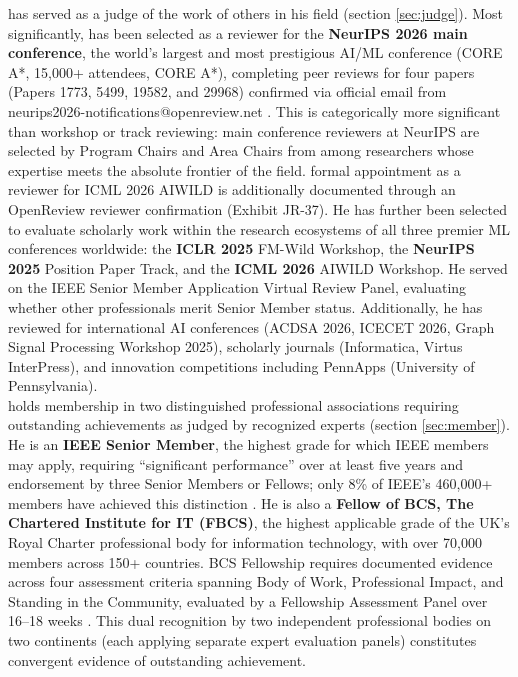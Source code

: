 \dr has served as a judge of the work of others in his field (section \ref{sec:judge}). Most significantly, \dr has been selected as a reviewer for the \textbf{NeurIPS 2026 main conference}, the world's largest and most prestigious AI/ML conference (CORE A*, 15,000+ attendees, CORE A*), completing peer reviews for four papers (Papers 1773, 5499, 19582, and 29968) confirmed via official email from neurips2026-notifications@openreview.net \cite{JR39,JR41,JR43,JR45}. This is categorically more significant than workshop or track reviewing: main conference reviewers at NeurIPS are selected by Program Chairs and Area Chairs from among researchers whose expertise meets the absolute frontier of the field. \drs formal appointment as a reviewer for ICML 2026 AIWILD is additionally documented through an OpenReview reviewer confirmation \cite{JR37} (Exhibit JR-37). He has further been selected to evaluate scholarly work within the research ecosystems of all three premier ML conferences worldwide: the \textbf{ICLR 2025} FM-Wild Workshop, the \textbf{NeurIPS 2025} Position Paper Track, and the \textbf{ICML 2026} AIWILD Workshop. He served on the IEEE Senior Member Application Virtual Review Panel, evaluating whether other professionals merit Senior Member status. Additionally, he has reviewed for international AI conferences (ACDSA 2026, ICECET 2026, Graph Signal Processing Workshop 2025), scholarly journals (Informatica, Virtus InterPress), and innovation competitions including PennApps (University of Pennsylvania).\\

\dr holds membership in two distinguished professional associations requiring outstanding achievements as judged by recognized experts (section \ref{sec:member}). He is an \textbf{IEEE Senior Member}, the highest grade for which IEEE members may apply, requiring ``significant performance'' over at least five years and endorsement by three Senior Members or Fellows; only 8\% of IEEE's 460,000+ members have achieved this distinction \cite{ieeeseniorresults}. He is also a \textbf{Fellow of BCS, The Chartered Institute for IT (FBCS)}, the highest applicable grade of the UK's Royal Charter professional body for information technology, with over 70,000 members across 150+ countries. BCS Fellowship requires documented evidence across four assessment criteria spanning Body of Work, Professional Impact, and Standing in the Community, evaluated by a Fellowship Assessment Panel over 16--18 weeks \cite{bcsfellowportal}. This dual recognition by two independent professional bodies on two continents (each applying separate expert evaluation panels) constitutes convergent evidence of outstanding achievement.\\

